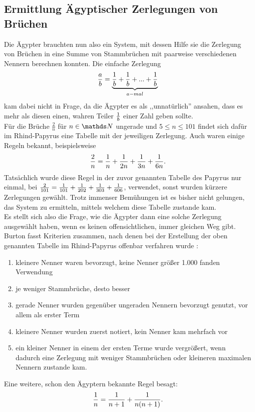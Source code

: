 \subsection[Zerlegung in Ägyptische Brüche]{Ermittlung Ägyptischer Zerlegungen von Brüchen}
Die Ägypter brauchten nun also ein System, mit dessen Hilfe sie die Zerlegung von Brüchen in eine Summe von Stammbrüchen mit paarweise verschiedenen Nennern berechnen konnten. Die einfache Zerlegung
$$\frac{a}{b} = \underbrace{\frac{1}{b} + \frac{1}{b} + ... +\frac{1}{b}}_{a-mal}$$
kam dabei nicht in Frage, da die Ägypter es als ,,unnatürlich'' ansahen, dass es mehr als diesen einen, wahren Teiler $\frac{1}{b}$ einer Zahl geben sollte. \cite[S.39]{Burton2011}\\
Für die Brüche $\frac{2}{n}$ für $n \in \N$ ungerade und $5 \leq n \leq 101$ findet sich dafür im Rhind-Papyrus eine Tabelle mit der jeweiligen Zerlegung. Auch waren einige Regeln bekannt, beispielsweise
$$\frac{2}{n} = \frac{1}{n} + \frac{1}{2n} + \frac{1}{3n} +\frac{1}{6n}.$$
Tatsächlich wurde diese Regel in der zuvor genannten Tabelle des Papyrus nur einmal, bei $\frac{2}{101} = \frac{1}{101}+\frac{1}{202}+\frac{1}{303}+\frac{1}{606}$, verwendet, sonst wurden kürzere Zerlegungen gewählt. Trotz immenser Bemühungen ist es bisher nicht gelungen, das System zu ermitteln, mittels welchem diese Tabelle zustande kam. \cite[S. 41]{Burton2011}\\
Es stellt sich also die Frage, wie die Ägypter dann eine solche Zerlegung ausgewählt haben, wenn es keinen offensichtlichen, immer gleichen Weg gibt. Burton fasst Kriterien zusammen, nach denen bei der Erstellung der oben genannten Tabelle im Rhind-Papyrus offenbar verfahren wurde \cite[S. 41]{Burton2011}:
\begin{enumerate}
	\item kleinere Nenner waren bevorzugt, keine Nenner größer 1.000 fanden Verwendung
	\item je weniger Stammbrüche, desto besser
	\item gerade Nenner wurden gegenüber ungeraden Nennern bevorzugt genutzt, vor allem als erster Term
	\item kleinere Nenner wurden zuerst notiert, kein Nenner kam mehrfach vor
	\item ein kleiner Nenner in einem der ersten Terme wurde vergrößert, wenn dadurch eine Zerlegung mit weniger Stammbrüchen oder kleineren maximalen Nennern zustande kam.
\end{enumerate}
\vspace{5mm}
Eine weitere, schon den Ägyptern bekannte Regel besagt:
\begin{equation}\label{formula:split}
\frac{1}{n} = \frac{1}{n+1} + \frac{1}{n(n+1)}.
\end{equation}
